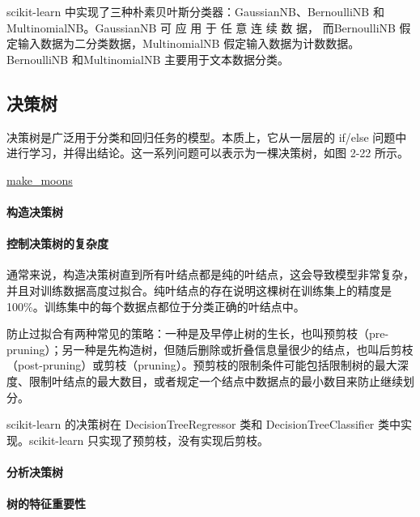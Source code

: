 scikit-learn 中实现了三种朴素贝叶斯分类器：GaussianNB、BernoulliNB 和 MultinomialNB。GaussianNB 可 应 用 于 任 意 连 续 数 据， 而BernoulliNB 假定输入数据为二分类数据，MultinomialNB 假定输入数据为计数数据。BernoulliNB 和MultinomialNB 主要用于文本数据分类。

\subsection{决策树}
决策树是广泛用于分类和回归任务的模型。本质上，它从一层层的 if/else 问题中进行学习，并得出结论。这一系列问题可以表示为一棵决策树，如图 2-22 所示。

\href{https://scikit-learn.org/stable/modules/generated/sklearn.datasets.make_moons.html}{make\_moons}

\paragraph{构造决策树}

\paragraph{控制决策树的复杂度} 通常来说，构造决策树直到所有叶结点都是纯的叶结点，这会导致模型非常复杂，并且对训练数据高度过拟合。纯叶结点的存在说明这棵树在训练集上的精度是 100\%。训练集中的每个数据点都位于分类正确的叶结点中。

防止过拟合有两种常见的策略：一种是及早停止树的生长，也叫预剪枝（pre-pruning）；另一种是先构造树，但随后删除或折叠信息量很少的结点，也叫后剪枝（post-pruning）或剪枝（pruning）。预剪枝的限制条件可能包括限制树的最大深度、限制叶结点的最大数目，或者规定一个结点中数据点的最小数目来防止继续划分。

scikit-learn 的决策树在 DecisionTreeRegressor 类和 DecisionTreeClassifier 类中实现。scikit-learn 只实现了预剪枝，没有实现后剪枝。

\paragraph{分析决策树}

\paragraph{树的特征重要性}
